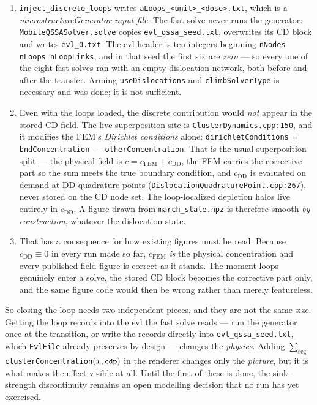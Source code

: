 \documentclass[11pt,a4paper]{article}
\newcommand{\code}[1]{\texttt{\small #1}}
\begin{document}
\begin{enumerate}\itemsep3pt
\item \code{inject\_discrete\_loops} writes \code{aLoops\_<unit>\_<dose>.txt},
      which is a \emph{microstructureGenerator input file}. The fast solve never
      runs the generator: \code{MobileQSSASolver.solve} copies
      \code{evl\_qssa\_seed.txt}, overwrites its CD block and writes
      \code{evl\_0.txt}. The evl header is ten integers beginning
      \code{nNodes nLoops nLoopLinks}, and in that seed the first six are
      \emph{zero} --- so every one of the eight fast solves ran with an empty
      dislocation network, both before and after the transfer. Arming
      \code{useDislocations} and \code{climbSolverType} is necessary and was
      done; it is not sufficient.

\item Even with the loops loaded, the discrete contribution would \emph{not}
      appear in the stored CD field. The live superposition site is
      \code{ClusterDynamics.cpp:150}, and it modifies the FEM's \emph{Dirichlet
      conditions} alone:
      \code{dirichletConditions = bndConcentration $-$ otherConcentration}. That
      is the usual superposition split --- the physical field is
      $c = c_{\text{FEM}} + c_{\text{DD}}$, the FEM carries the corrective part
      so the sum meets the true boundary condition, and $c_{\text{DD}}$ is
      evaluated on demand at DD quadrature points
      (\code{DislocationQuadraturePoint.cpp:267}), never stored on the CD node
      set. The loop-localized depletion halos live entirely in $c_{\text{DD}}$.
      A figure drawn from \code{march\_state.npz} is therefore smooth
      \emph{by construction}, whatever the dislocation state.

\item That has a consequence for how existing figures must be read.
      Because $c_{\text{DD}} \equiv 0$ in every run made so far,
      $c_{\text{FEM}}$ \emph{is} the physical concentration and every published
      field figure is correct as it stands. The moment loops genuinely enter a
      solve, the stored CD block becomes the corrective part only, and the same
      figure code would then be wrong rather than merely featureless.
\end{enumerate}

So closing the loop needs two independent pieces, and they are not the same
size. Getting the loop records into the evl the fast solve reads --- run the
generator once at the transition, or write the records directly into
\code{evl\_qssa\_seed.txt}, which \code{EvlFile} already preserves by design ---
changes the \emph{physics}. Adding $\sum_{\text{seg}}$
\code{clusterConcentration}$(x, \code{cdp})$ in the renderer changes only the
\emph{picture}, but it is what makes the effect visible at all. Until the first
of these is done, the sink-strength discontinuity remains an open modelling
decision that no run has yet exercised.
\end{document}
